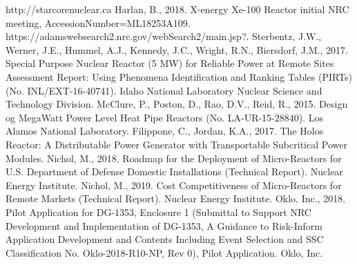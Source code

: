 \documentclass[10pt,a4paper]{article}
\begin{document}
\begin{thebibliography}{X}
 http://starcorenuclear.ca
 Harlan, B., 2018. X-energy Xe-100 Reactor initial NRC meeting, AccessionNumber=ML18253A109. 
 https://adamswebsearch2.nrc.gov/webSearch2/main.jsp?.
  Sterbentz, J.W., Werner, J.E., Hummel, A.J., Kennedy, J.C., Wright, R.N., Biersdorf, J.M., 2017. Special Purpose Nuclear Reactor (5 MW) for Reliable Power at Remote Sites Assessment Report: Using Phenomena Identification and Ranking Tables (PIRTs) (No. INL/EXT-16-40741). Idaho National Laboratory Nuclear Science and Technology Division.
  McClure, P., Poston, D., Rao, D.V., Reid, R., 2015. Design og MegaWatt Power Level Heat Pipe Reactors (No. LA-UR-15-28840). Los Alamos National Laboratory.
  Filippone, C., Jordan, K.A., 2017. The Holos Reactor: A Distributable Power Generator with Transportable Subcritical Power Modules. 
 Nichol, M., 2018. Roadmap for the Deployment of Micro-Reactors for U.S. Department of Defense Domestic Installations (Technical Report). Nuclear Energy Institute.
 Nichol, M., 2019. Cost Competitiveness of Micro-Reactors for Remote Markets (Technical Report). Nuclear Energy Institute.
 Oklo, Inc., 2018. Pilot Application for DG-1353, Enclosure 1 (Submittal to Support NRC Development and Implementation of DG-1353, A Guidance to Risk-Inform Application Development and Contents Including Event Selection and SSC Classification No. Oklo-2018-R10-NP, Rev 0), Pilot Application. Oklo, Inc.



\end{thebibliography}
\end{document}
